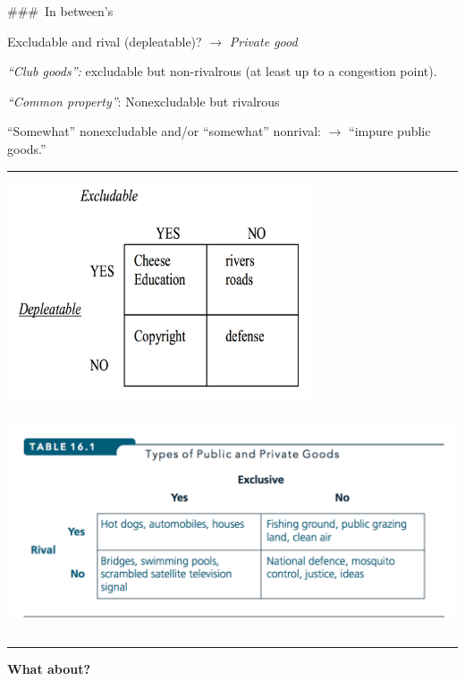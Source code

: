 \documentclass[]{article}
\begin{document}
\#\#\#~In between's

Excludable and rival (depleatable)? \(\rightarrow\) \emph{Private good}

\bigskip

\emph{``Club goods'':} excludable but non-rivalrous (at least up to a congestion point).

\bigskip

\emph{``Common property''}: Nonexcludable but rivalrous

\bigskip

``Somewhat'' nonexcludable and/or ``somewhat'' nonrival: \(\rightarrow\) ``impure public goods.''

\begin{center}\rule{0.5\linewidth}{\linethickness}\end{center}

\includegraphics[height=2.5in]{picsfigs/rivalexcludabletable1.png}

\includegraphics[height=2.5in]{picsfigs/rivalexcludabletable.png}

\begin{center}\rule{0.5\linewidth}{\linethickness}\end{center}

\textbf{What about?}
\end{document}
